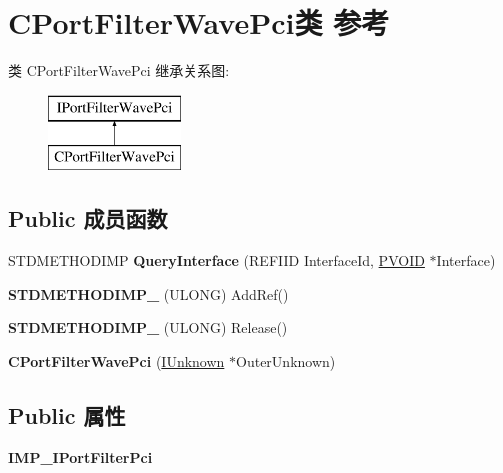 \hypertarget{class_c_port_filter_wave_pci}{}\section{C\+Port\+Filter\+Wave\+Pci类 参考}
\label{class_c_port_filter_wave_pci}
类 C\+Port\+Filter\+Wave\+Pci 继承关系图\+:\begin{figure}[H]
\begin{center}
\leavevmode
\includegraphics[height=2.000000cm]{class_c_port_filter_wave_pci}
\end{center}
\end{figure}
\subsection*{Public 成员函数}
\begin{DoxyCompactItemize}
\item 
\mbox{\label{class_c_port_filter_wave_pci_aa6c5f2f4be8a9e06ed17f3045269e96a}} 
S\+T\+D\+M\+E\+T\+H\+O\+D\+I\+MP {\bfseries Query\+Interface} (R\+E\+F\+I\+ID Interface\+Id, \hyperlink{interfacevoid}{P\+V\+O\+ID} $\ast$Interface)
\item 
\mbox{\label{class_c_port_filter_wave_pci_affb8c59b3343472fe3a18195fadf1fc6}} 
{\bfseries S\+T\+D\+M\+E\+T\+H\+O\+D\+I\+M\+P\+\_\+} (U\+L\+O\+NG) Add\+Ref()
\item 
\mbox{\label{class_c_port_filter_wave_pci_af1cd45558ce4e883299fbeebc9946fa3}} 
{\bfseries S\+T\+D\+M\+E\+T\+H\+O\+D\+I\+M\+P\+\_\+} (U\+L\+O\+NG) Release()
\item 
\mbox{\label{class_c_port_filter_wave_pci_af48e02a36013a4f37311a87b553164f4}} 
{\bfseries C\+Port\+Filter\+Wave\+Pci} (\hyperlink{interface_i_unknown}{I\+Unknown} $\ast$Outer\+Unknown)
\end{DoxyCompactItemize}
\subsection*{Public 属性}
\begin{DoxyCompactItemize}
\item 
\mbox{\label{class_c_port_filter_wave_pci_ae32f3683c62cb34d3f4fa6e29bb0654b}} 
{\bfseries I\+M\+P\+\_\+\+I\+Port\+Filter\+Pci}
\end{DoxyCompactItemize}

